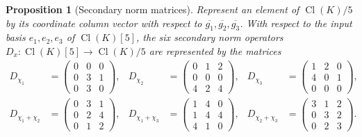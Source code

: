 \documentclass[11pt]{article}
\newcommand{\Cl}{\operatorname{Cl}}
\newtheorem{proposition}{Proposition}
\begin{document}
\begin{proposition}[Secondary norm matrices]\label{prop:Dmatrices}
Represent an element of $\Cl(K)/5$ by its coordinate column vector with
respect to $\overline{g_1},\overline{g_2},\overline{g_3}$.  With respect to the
input basis $e_1,e_2,e_3$ of $\Cl(K)[5]$, the six secondary norm operators
$D_x\colon \Cl(K)[5]\to\Cl(K)/5$ are represented by the matrices
\begin{align*}
D_{\chi_1}&=
\begin{pmatrix}0&0&0\\0&3&1\\0&3&0\end{pmatrix},&
D_{\chi_2}&=
\begin{pmatrix}0&1&2\\0&0&0\\4&2&4\end{pmatrix},&
D_{\chi_3}&=
\begin{pmatrix}1&2&0\\4&0&1\\0&0&0\end{pmatrix},\\[2mm]
D_{\chi_1+\chi_2}&=
\begin{pmatrix}0&3&1\\0&2&4\\0&1&2\end{pmatrix},&
D_{\chi_1+\chi_3}&=
\begin{pmatrix}1&4&0\\1&4&4\\4&1&0\end{pmatrix},&
D_{\chi_2+\chi_3}&=
\begin{pmatrix}3&1&2\\0&3&2\\0&2&3\end{pmatrix}.
\end{align*}
\end{proposition}
\end{document}

